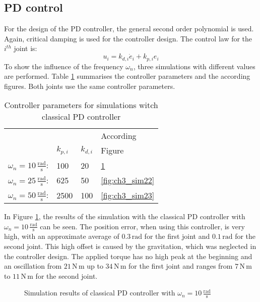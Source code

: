 \subsection{PD control}
For the design of the PD controller, the general second order polynomial is used. Again, critical damping is used for the controller design. The control law for the $i^{th}$ joint is:
\begin{equation*}
	u_i = k_{d,i} \dot{e}_i + k_{p,i} e_i
\end{equation*} To show the influence of the frequency $\omega_n$, three simulations with different values are performed. Table \ref{tab:ch3_pd} summarises the controller parameters and the according figures. Both joints use the same controller parameters.
\begin{table}[H]
	\begin{center}
		\caption{Controller parameters for simulations witch classical PD controller}
		\label{tab:ch3_pd}
		\begin{tabular}{llll}
			& & & According \\
			& $k_{p,i}$ & $k_{d,i}$ & Figure \\
			\midrule
			$\omega_n = 10\,\mathrm{\frac{rad}{s}}$: & 100 & 20 & \ref{fig:ch3_sim21} \\
			$\omega_n = 25\,\mathrm{\frac{rad}{s}}$: & 625 & 50 & \ref{fig:ch3_sim22} \\
			$\omega_n = 50\,\mathrm{\frac{rad}{s}}$: & 2500 & 100 & \ref{fig:ch3_sim23} \\
			\bottomrule
		\end{tabular}
	\end{center}
\end{table}
In Figure \ref{fig:ch3_sim21}, the results of the simulation with the classical PD controller with $\omega_n = 10\,\mathrm{\frac{rad}{s}}$ can be seen. The position error, when using this controller, is very high, with an approximate average of $0.3\,\mathrm{rad}$ for the first joint and $0.1\,\mathrm{rad}$ for the second joint. This high offset is caused by the gravitation, which was neglected in the controller design. The applied torque has no high peak at the beginning and an oscillation from $21\,\mathrm{N\,m}$ up to $34\,\mathrm{N\,m}$ for the first joint and ranges from $7\,\mathrm{N\,m}$ to $11\,\mathrm{N\,m}$ for the second joint.
\begin{figure}[H]
	\centering
	
	\caption{Simulation results of classical PD controller with $\omega_n = 10\,\mathrm{\frac{rad}{s}}$}
	\label{fig:ch3_sim21}
\end{figure}
